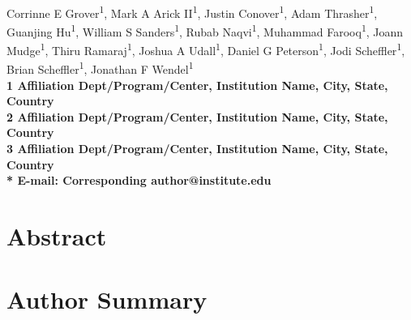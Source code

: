 \documentclass[10pt,letterpaper]{article}
\date{}
\begin{document}
\vspace*{0.35in}

\begin{flushleft}
{\Large
\textbf{}
}
\newline
\\
Corrinne E Grover\textsuperscript{1},
Mark A Arick II\textsuperscript{1},
Justin Conover\textsuperscript{1},
Adam Thrasher\textsuperscript{1},
Guanjing Hu\textsuperscript{1},
William S Sanders\textsuperscript{1},
Rubab Naqvi\textsuperscript{1},
Muhammad Farooq\textsuperscript{1},
Joann Mudge\textsuperscript{1},
Thiru Ramaraj\textsuperscript{1},
Joshua A Udall\textsuperscript{1},
Daniel G Peterson\textsuperscript{1},
Jodi Scheffler\textsuperscript{1},
Brian Scheffler\textsuperscript{1},
Jonathan F Wendel\textsuperscript{1}
\\
\bf{1} Affiliation Dept/Program/Center, Institution Name, City, State, Country
\\
\bf{2} Affiliation Dept/Program/Center, Institution Name, City, State, Country
\\
\bf{3} Affiliation Dept/Program/Center, Institution Name, City, State, Country
\\

% 
%
* E-mail: Corresponding author@institute.edu
\end{flushleft}
\section*{Abstract}


\section*{Author Summary}


\linenumbers
\end{document}
